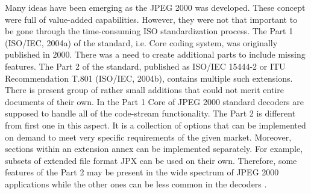 Many ideas have been emerging as the JPEG 2000 was developed. These concept were full of
value-added capabilities. However, they were not that important to be gone through the time-consuming
ISO standardization process. The Part 1 (ISO/IEC, 2004a) of the standard, i.e. Core coding system, 
was originally published in 2000. There was a need to create additional parts to include
missing features. The Part 2 of the standard, published as ISO/IEC 15444-2 or ITU Recommendation
T.801 (ISO/IEC, 2004b), contains multiple such extensions. There is present group of rather small
additions that could not merit entire documents of their own. In the Part 1 Core of JPEG 2000
standard decoders are supposed to handle all of the code-stream functionality. The Part 2
is different from first one in this aspect. It is a collection of options that can be
implemented on demand to meet very specific requirements of the given market. Moreover,
sections within an extension annex can be implemented separately. For example, subsets
of extended file format JPX can be used on their own. Therefore, some features of the Part 2
may be present in the wide spectrum of JPEG 2000 applications while the other ones can be
less common in the decoders \cite{jpeg_suite}.

